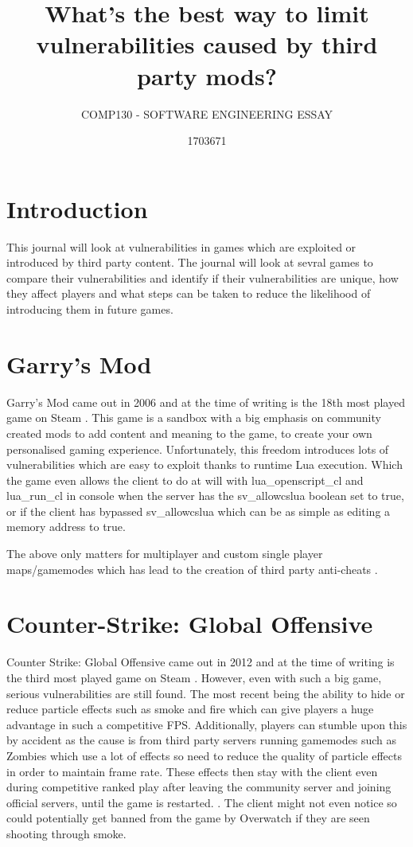 \documentclass{scrartcl}
\title{What's the best way to limit vulnerabilities caused by third party mods?}
\subtitle{COMP130 - SOFTWARE ENGINEERING ESSAY}
\author{1703671}
\begin{document}
\maketitle

\section{Introduction}
This journal will look at vulnerabilities in games which are exploited or introduced by third party content. The journal will look at sevral games \cite{GMOD, CSGODATE, GTASA}  to compare their vulnerabilities and identify if their vulnerabilities are unique, how they affect players and what steps can be taken to reduce the likelihood of introducing them in future games.

\section{Garry's Mod}
Garry's Mod came out in 2006 \cite{GMOD} and at the time of writing is the 18th most played game on Steam \cite{STEAMSTATS}. This game is a sandbox with a big emphasis on community created mods to add content and meaning to the game, to create your own personalised gaming experience. Unfortunately, this freedom introduces lots of vulnerabilities which are easy to exploit thanks to runtime Lua execution. Which the game even allows the client to do at will with lua_openscript_cl and lua_run_cl \cite{GMODSCRIPTS} in console when the server has the sv_allowcslua boolean set to true, or if the client has bypassed sv_allowcslua which can be as simple as editing a memory address to true.

The above only matters for multiplayer and custom single player maps/gamemodes which has lead to the creation of third party anti-cheats \cite{CAKE, QUACK}.

\section{Counter-Strike: Global Offensive}
Counter Strike: Global Offensive came out in 2012 \cite{CSGODATE} and at the time of writing is the third most played game on Steam \cite{STEAMSTATS}. However, even with such a big game, serious vulnerabilities are still found. The most recent being the ability to hide or reduce particle effects such as smoke and fire which can give players a huge advantage in such a competitive FPS. Additionally, players can stumble upon this by accident as the cause is from third party servers running gamemodes such as Zombies which use a lot of effects so need to reduce the quality of particle effects in order to maintain frame rate. These effects then stay with the client even during competitive ranked play after leaving the community server and joining official servers, until the game is restarted. \cite{CSGO}. The client might not even notice so could potentially get banned from the game by Overwatch \cite{CSGODATE} if they are seen shooting through smoke.
\end{document}
